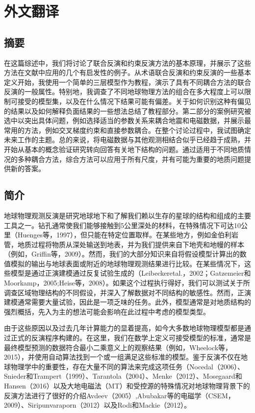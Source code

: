 \cleardoublepage
\newrefsection
\chapter{外文翻译}

\section{摘要}

在这篇综述中，我们将讨论了联合反演和约束反演方法的基本原理，并展示了这些方法在文献中应用的几个有启发性的例子。从术语联合反演和约束反演的一些基本定义开始，我使用一个简单的三层模型作为教程，演示了具有不同耦合方法的联合反演的一般属性。特别地，我调查了不同地球物理方法的组合在多大程度上可以限制可接受的模型集，以及在什么情况下结果可能有偏差。关于如何识别这种有偏见的结果以及如何解释负面结果的一些想法总结了教程部分。第二部分的案例研究被选中以突出具体问题，例如选择适当的参数关系来耦合地震和电磁数据，并展示最常用的方法，例如交叉梯度约束和直接参数耦合。在整个讨论过程中，我试图确定未来工作的主题。总的来说，将电磁数据与其他观测相结合似乎已经趋于成熟，并开始从基本的概念验证研究转向回答有关地下结构的问题。通过适用于不同地质情况的多种耦合方法，综合方法可以应用于所有尺度，并有可能为重要的地质问题提供新的答案。

\section{简介}

地球物理观测反演是研究地球地下和了解我们赖以生存的星球的结构和组成的主要工具之一。钻孔通常使我们能够接触到5公里深处的材料，在特殊情况下可达10公里（Huenges等，1997），但只能在特定位置取样。在某些地方，例如金伯利岩管，地质过程将物质从深处输送到地表，并为我们提供来自下地壳和地幔的样本（例如，Griffin等，2009）。然而，我们的大部分知识来自将假设模型计算出的数值模拟的输出与地球表面或附近的地球物理观测结果进行比较。在某些情况下，这些模型是通过正演建模通过反复试验生成的（Leibeckeretal.，2002；Gatzemeier和 Moorkamp，2005;Heise等，2008）。如果这个过程执行得好，我们可以测试关于所调查区域物理结构的不同假设，并深入了解数据对不同结构的敏感性。然而，正演建模通常需要大量试验，因此是一项乏味的任务。此外，模型通常是对地质结构的强烈概括，先入为主的想法可能会影响在此过程中考虑的模型类型。

由于这些原因以及过去几年计算能力的显着提高，如今大多数地球物理模型都是通过正式的反演程序构建的。在这里，我们在数学上定义可接受模型的标准，通常是最终模型预测的数据符合最小二乘意义上的观察结果（例如，Wheelock等，2015），并使用自动算法找到一个或一组满足这些标准的模型。鉴于反演不仅在地球物理学中的重要性，存在大量不同的算法来完成这项任务（Nocedal（2006）、 Snieder和Trampert（1999）、Tarantola（2004）、Menke（2012）、Mosegaard和Hansen（2016）以及大地电磁法（MT）和受控源的特殊情况对地球物理背景下的反演方法进行了很好的介绍Avdeev（2005）,Abubakar等的电磁学（CSEM，2009）、Siripunvaraporn（2012）以及Rodi和Mackie（2012）。

